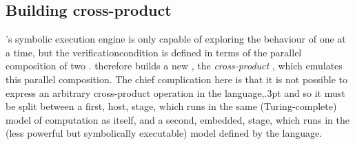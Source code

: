 \subsection{Building cross-product {\StateMachines}}
\label{sect:using:build_cross_product}

{\Technique}'s symbolic execution engine is only capable of exploring
the behaviour of one {\StateMachine} at a time, but the
\gls{verificationcondition} is defined in terms of the parallel
composition of two {\StateMachines}.  {\Technique} therefore builds a
new {\StateMachine}, the \emph{cross-product {\StateMachine}}, which
emulates this parallel composition.  The chief complication here is
that it is not possible to express an arbitrary cross-product
operation in the {\StateMachine} language,\kern.3pt and so it must be split between a first, host,
stage, which runs in the same (Turing-complete) model of computation
as {\technique} itself, and a second, embedded, stage, which runs in
the (less powerful but symbolically executable) model defined by the
{\StateMachine} language.

